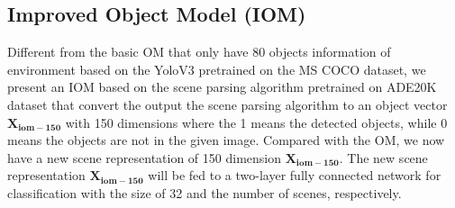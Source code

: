 \documentclass[letterpaper, 10 pt, conference]{ieeeconf}  %
\begin{document}
%

\subsection{Improved Object Model (IOM)}

Different from the basic OM that only have 80 objects information of environment based on the YoloV3 pretrained on the MS COCO dataset, we present an IOM based on the scene parsing algorithm pretrained on ADE20K \cite{Zhou2017} dataset that convert the output the scene parsing algorithm to an object vector $\mathbf{X_{iom-150}}$ with 150 dimensions where the 1 means the detected objects, while 0 means the objects are not in the given image. Compared with the OM, we now have a new scene representation of 150 dimension $\mathbf{X_{iom-150}}$. The new scene representation $\mathbf{X_{iom-150}}$ will  be fed to a two-layer fully connected network for classification with the size of 32 and the number of scenes, respectively.
\end{document}
